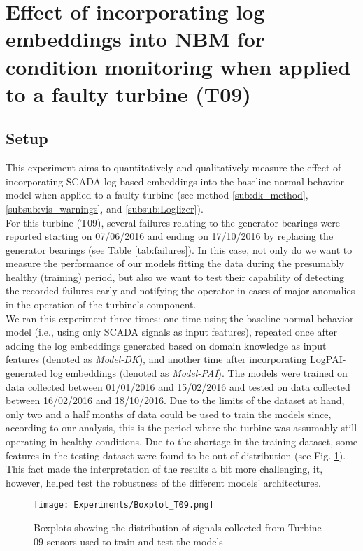 
\section{Effect of incorporating log embeddings into NBM for condition monitoring when applied to a faulty turbine (T09)}
\subsection{Setup}
This experiment aims to quantitatively and qualitatively measure 
the effect of incorporating SCADA-log-based embeddings into the baseline normal behavior model when applied to a faulty turbine 
(see method \ref{sub:dk_method}, \ref{subsub:vis_warnings}, and \ref{subsub:Loglizer}).\\
For this turbine (T09), several failures relating to the generator bearings were reported starting on 07/06/2016 and ending on 17/10/2016
by replacing the generator bearings (see Table \ref{tab:failures}). In this case, not only do we want to measure the performance of our models fitting the data 
during the presumably healthy (training) period, but also we want to test their capability of detecting the recorded failures early and notifying the operator 
in cases of major anomalies in the operation of the turbine's component.\\
We ran this experiment three times: one time using the baseline normal behavior model (i.e., using only SCADA signals as input features), 
repeated once after adding the log embeddings generated based on domain knowledge as input features (denoted as \emph{Model-DK}), and 
another time after incorporating LogPAI-generated log embeddings (denoted as \emph{Model-PAI}).
The models were trained on data collected between 01/01/2016 and 15/02/2016 and tested on data collected between
16/02/2016 and 18/10/2016. Due to the limits of the dataset at hand, only two and a half months of data could be used to train the models since, 
according to our analysis, this is the period where the turbine was assumably still operating in healthy conditions.
Due to the shortage in the training dataset, some features in the testing dataset were found to be out-of-distribution (see Fig. \ref{fig:Boxplot_T09}). 
This fact made the interpretation of the results a bit more challenging, it, however, helped test the robustness of the 
different models' architectures.

\begin{figure}[h]
    \begin{center}
      \texttt{[image: Experiments/Boxplot\_T09.png]}
    \end{center}
    \caption{Boxplots showing the distribution of signals collected from Turbine 09 sensors used to train and test the models}
    \label{fig:Boxplot_T09}
  \end{figure}

